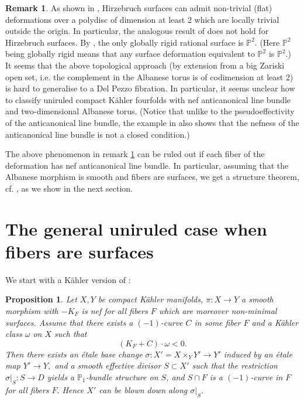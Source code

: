 \documentclass[a4, 12pt]{amsart}
\newtheorem{prop}[thm]{Proposition}
\numberwithin{equation}{section}
\theoremstyle{definition}
\newtheorem{rem}[thm]{Remark}
\def\P{\mathbb{P}}
\def\P{\mathbb{P}}
\begin{document}
\begin{rem}\label{remark 3}
As shown in \cite[Example 1.2]{Cat83}, Hirzebruch surfaces can admit non-trivial (flat) deformations over a polydisc of dimension at least 2 which are locally trivial outside the origin.
In particular, the analogous result of \cite{ARM14} does not hold for Hirzebruch surfaces.
By \cite[Theorem 1.3]{BC18}, the only globally rigid rational surface is $\P^2$.
(Here $\P^2$ being globally rigid means that any surface deformation equivalent to $\P^2$ is $\P^2$.)
It seems that the above topological approach (by extension from a big Zariski open set, i.e. the complement in the Albanese torus is of codimension at least 2) is hard to generalise to a Del Pezzo fibration. 
In particular, it seems unclear how to classify uniruled compact K\"ahler fourfolds with nef anticanonical line bundle and two-dimensional Albanese torus.
(Notice that unlike to the pseudoeffectivity of the anticanonical line bundle, the example in \cite{Cat83} also shows that the nefness of the anticanonical line bundle is not a closed condition.)
\end{rem}

The above phenomenon in remark \ref{remark 3} can be ruled out if each fiber of the deformation has nef anticanonical line bundle.
In particular, assuming that the Albanese morphism is smooth and fibers are surfaces, we get a structure theorem, cf. \cite[Cor. 3.4]{PS98}, 
as we show in the next section.

\section{The general uniruled case when fibers are surfaces}

We start with a K\"ahler version of \cite[Proposition 0.4]{PS98}:

\begin{prop}
\label{PS04}
 Let $X, Y$ be compact K\"ahler manifolds, $\pi: X \to Y$ a smooth
morphism with $-K_F$ is nef for all fibers $F$ which are moreover non-minimal surfaces.
Assume that there exists a $(-1)$-curve $C$ in some fiber $F$ and a K\"ahler class $\omega$ on $X$ such that
$$(K_F+C) \cdot \omega<0.$$
Then there exists an \'etale base change $\sigma : X' = X \times_Y Y' \to Y'$
induced by an \'etale map $Y' \to Y,$ and a smooth effective divisor $S \subset X'$ such that the restriction
$ \sigma \vert_S : S \to D$ yields a $\P_1$-bundle structure on $S$, and $S \cap F$ is a
$(-1)$-curve in $F$ for all fibers $F.$ Hence $X'$ can be blown down along $\sigma \vert_S.$

\end{prop}
\end{document}
